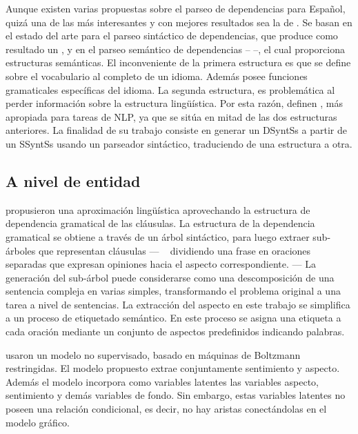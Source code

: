 \label{ballesteros}
Aunque existen varias propuestas sobre el parseo de dependencias para
Español, quizá una de las más interesantes y con mejores resultados
sea la de \citeauthor{ballesteros2016} \cite{ballesteros2016}. Se
basan en el estado del arte para el parseo sintáctico de dependencias,
que produce como resultado un , y en el
parseo semántico de dependencias --  --,
el cual proporciona estructuras semánticas. El inconveniente de la
primera estructura es que se define sobre el vocabulario al completo
de un idioma. Además posee funciones gramaticales específicas del
idioma. La segunda estructura, es problemática al perder información
sobre la estructura lingüística. Por esta razón,
\citeauthor{ballesteros2016} definen ,
más apropiada para tareas de \ac{NLP}, ya que se sitúa en mitad de las
dos estructuras anteriores. La finalidad de su trabajo consiste en
generar un \ac{DSyntSs} a partir de un \ac{SSyntSs} usando un
parseador sintáctico, traduciendo de una estructura a otra.

\subsection{A nivel de entidad}
\label{subsec:soaentity}

\citeauthor{Thet2010} \cite{Thet2010} propusieron una aproximación lingüística
aprovechando la estructura de dependencia gramatical de las cláusulas. La
estructura de la dependencia gramatical se obtiene a través de un árbol
sintáctico, para luego extraer sub-árboles que representan cláusulas --- \eg~
dividiendo una frase en oraciones separadas que expresan opiniones hacia el
aspecto correspondiente. --- La generación del sub-árbol puede considerarse como
una descomposición de una sentencia compleja en varias simples, transformando el
problema original a una tarea a nivel de sentencias. La extracción del aspecto
en este trabajo se simplifica a un proceso de etiquetado semántico. En este
proceso se asigna una etiqueta a cada oración mediante un conjunto de aspectos
predefinidos indicando palabras.

\citeauthor{Wang2015} \cite{Wang2015} usaron un modelo no supervisado, basado en
máquinas de Boltzmann restringidas. El modelo propuesto extrae conjuntamente
sentimiento y aspecto. Además el modelo incorpora como variables latentes las
variables aspecto, sentimiento y demás variables de fondo. Sin embargo, estas
variables latentes no poseen una relación condicional, es decir, no hay aristas
conectándolas en el modelo gráfico.

